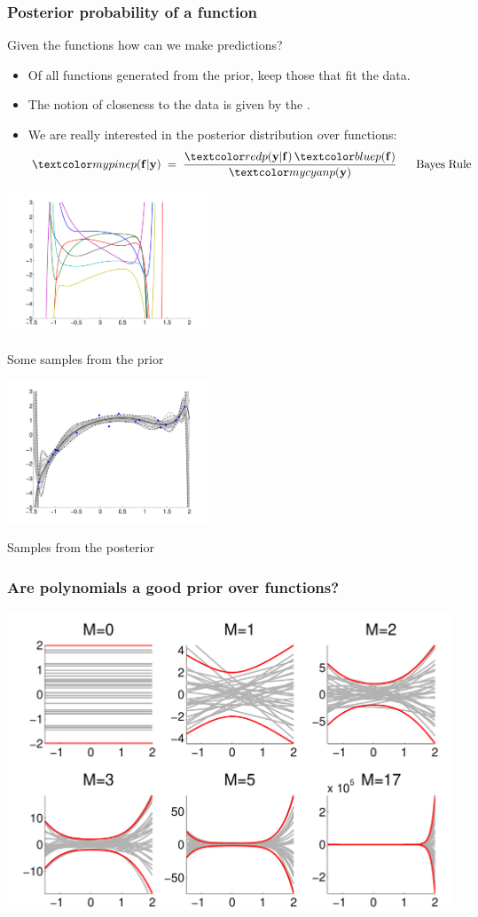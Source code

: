\begin{frame}
\frametitle{Posterior probability of a function}

Given the   functions  how can we make predictions?
\begin{itemize}
\item Of all functions generated from the prior, keep those that fit the data.
\item The notion of closeness to the data is given by the .
\item We are really interested in the posterior distribution over functions:
%
\[
\Green{p(\bff|\bfy)}\;=\;\frac{\Red{p(\bfy|\bff)}\,\Blue{p(\bff)}}{\Cyan{p(\bfy)}}
{\; \; \; \; \; \;} \mathrm{Bayes\; Rule}
\]
%
\end{itemize}

\parbox{0.45\textwidth}{
\centerline{\includegraphics[width=0.45\textwidth]{random_polynomials_degree17.pdf}}
\centerline{Some samples from the prior}
}
\parbox{0.45\textwidth}{
\centerline{\includegraphics[width=0.45\textwidth]{samples_posterior_degree17.pdf}}
\centerline{Samples from the posterior}
}
\end{frame}


\begin{frame}
\frametitle{Are polynomials a good prior over functions?}

\centerline{\includegraphics[width=\textwidth]{polynomial_prior_envelope}}
\end{frame}

